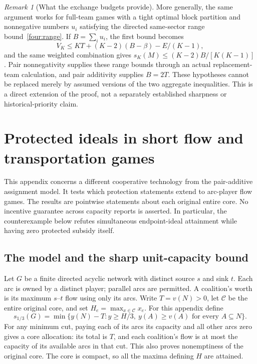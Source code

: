 \documentclass[11pt]{article}
\theoremstyle{remark}
\newtheorem{remark}[theorem]{Remark}
\newcommand{\core}{\mathcal C}
\begin{document}
\begin{remark}[What the exchange budgets provide]\label{four:exchange}
More generally, the same argument works for full-team games with a tight
optimal block partition and nonnegative numbers $u_i$ satisfying the
directed same-sector range bound~\eqref{four:range}. If
$B=\sum_i u_i$, the first bound becomes
\[
       V_K\le KT+(K-2)(B-\beta)-E/(K-1),
\]
and the same weighted combination gives
$s_K(M)\le (K-2)B/[K(K-1)]$.
Pair nonnegativity supplies these range bounds through an actual
replacement-team calculation, and pair additivity supplies $B=2T$.
These hypotheses cannot be replaced merely by assumed versions of the
two aggregate inequalities. This is a direct extension of the proof,
not a separately established sharpness or historical-priority claim.
\end{remark}

\section{Protected ideals in short flow and transportation games}\label{flow:section}
This appendix concerns a different cooperative technology from the
pair-additive assignment model. It tests which protection statements extend
to arc-player flow games. The results are pointwise statements about each
original entire core. No incentive guarantee across capacity reports is
asserted. In particular, the counterexample below refutes simultaneous
endpoint-ideal attainment while having zero protected subsidy itself.

\subsection{The model and the sharp unit-capacity bound}
Let $G$ be a finite directed acyclic network with distinct source $s$ and
sink $t$. Each arc is owned by a distinct player; parallel arcs are
permitted. A coalition's worth is its maximum $s$--$t$ flow using only its
arcs. Write $T=v(N)>0$, let $\core$ be the entire original core, and set
$H_e=\max_{x\in\core}x_e$. For this appendix define
\[
 s_{1/3}(G)=\min\{y(N)-T:y\ge H/3,\ y(A)\ge v(A)
                                   \text{ for every }A\subseteq N\}.
\]
For any minimum cut, paying each of its arcs its capacity and all other
arcs zero gives a core allocation: its total is $T$, and each coalition's
flow is at most the capacity of its available arcs in that cut. This
also proves nonemptiness of the original core. The core is compact, so
all the maxima defining $H$ are attained.
\end{document}
